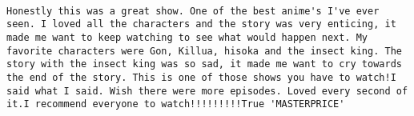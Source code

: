 \documentclass[
]{article}
\begin{document}
\begin{verbatim}
                                                                                                                                                                                                                                                                                                                                                                                                                                                                                                                                                                                                                                                                                                                                                                                                                                                                                                                                                                                                                                                                                                                                                                                           Honestly this was a great show. One of the best anime's I've ever seen. I loved all the characters and the story was very enticing, it made me want to keep watching to see what would happen next. My favorite characters were Gon, Killua, hisoka and the insect king. The story with the insect king was so sad, it made me want to cry towards the end of the story. This is one of those shows you have to watch!I said what I said. Wish there were more episodes. Loved every second of it.I recommend everyone to watch!!!!!!!!!True 'MASTERPRICE'

\end{verbatim}
\end{document}
